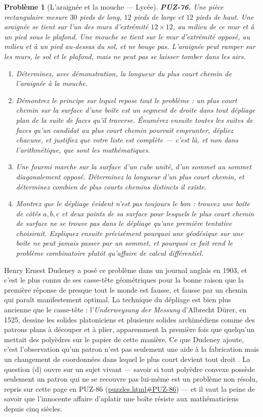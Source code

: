 \documentclass[11pt]{article}
\newtheorem{problem}{Problème}
\begin{document}
\begin{problem}[{L'araignée et la mouche --- Lycée}]
\textbf{PUZ-76.} Une pièce rectangulaire mesure $ 30 $ pieds de long, $ 12 $ pieds de
large et $ 12 $ pieds de haut. Une araignée se tient sur l'un des murs d'extrémité
$ 12 \times 12 $, au milieu de ce mur et à un pied sous le plafond. Une mouche se tient
sur le mur d'extrémité opposé, au milieu et à un pied au-dessus du sol, et ne bouge pas.
L'araignée peut ramper sur les murs, le sol et le plafond, mais ne peut pas se laisser
tomber dans les airs.
\begin{enumerate}
\item[(a)] Déterminez, avec démonstration, la longueur du plus court chemin de l'araignée à la
mouche.
\item[(b)] Démontrez le principe sur lequel repose tout le problème : un plus court chemin sur la
surface d'une boîte est un segment de droite dans tout dépliage plan de la suite de faces
qu'il traverse. Énumérez ensuite toutes les suites de faces qu'un candidat au plus court
chemin pourrait emprunter, dépliez chacune, et justifiez que votre liste est complète ---
c'est là, et non dans l'arithmétique, que sont les mathématiques.
\item[(c)] Une fourmi marche sur la surface d'un cube unité, d'un sommet au sommet diagonalement
opposé. Déterminez la longueur d'un plus court chemin, et déterminez combien de plus courts
chemins distincts il existe.
\item[(d)] Montrez que le dépliage évident n'est pas toujours le bon : trouvez une boîte de côtés
$ a, b, c $ et deux points de sa surface pour lesquels le plus court chemin de surface ne
se trouve \textit{pas} dans le dépliage qu'une première tentative choisirait. Expliquez
ensuite précisément pourquoi une géodésique sur une boîte ne peut jamais passer par un
sommet, et pourquoi ce fait rend le problème combinatoire plutôt qu'affaire de calcul
différentiel.
\end{enumerate}

\end{problem}

\noindent Henry Ernest Dudeney a posé ce problème dans un journal anglais en 1903,
et c'est le plus connu de ses casse-tête géométriques pour la bonne raison que la première
réponse de presque tout le monde est fausse, et fausse par un chemin qui paraît manifestement
optimal. La technique du dépliage est bien plus ancienne que le casse-tête :
l'\textit{Underweysung der Messung} d'Albrecht Dürer, en 1525, dessine les solides platoniciens
et plusieurs solides archimédiens comme des patrons plans à découper et à plier,
apparemment la première fois que quelqu'un mettait des polyèdres sur le papier de cette
manière. Ce que Dudeney ajoute, c'est l'observation qu'un patron n'est pas seulement une aide
à la fabrication mais un changement de coordonnées dans lequel \og{} le plus court \fg{} devient
\og{} tout droit \fg{}. La question (d) ouvre sur un sujet vivant --- savoir si tout polyèdre convexe
possède seulement un patron qui ne se recouvre pas lui-même est un problème non résolu,
repris sur cette page en PUZ-86 (\url{puzzles.html#PUZ-86}) --- et il vaut la peine de savoir que
l'innocente affaire d'aplatir une boîte résiste aux mathématiciens depuis cinq siècles.
\end{document}
